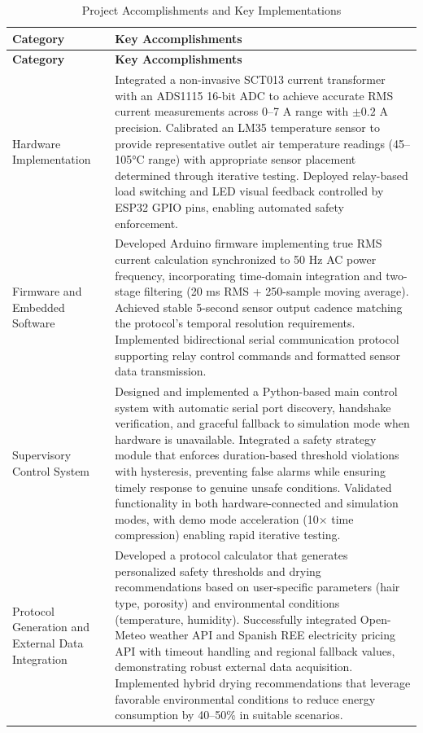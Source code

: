 \documentclass[11pt,a4paper]{article}
\begin{document}
\begin{longtable}{|p{}|p{}|}
\caption{Project Accomplishments and Key Implementations}
\label{tab:accomplishments} \\
\hline
\textbf{Category} & \textbf{Key Accomplishments} \\
\hline
\endfirsthead
\hline
\textbf{Category} & \textbf{Key Accomplishments} \\
\hline
\endhead
\hline
\endfoot
\hline
\endlastfoot
Hardware Implementation & Integrated a non-invasive SCT013 current transformer with an ADS1115 16-bit ADC to achieve accurate RMS current measurements across 0--7 A range with $\pm 0.2$ A precision. Calibrated an LM35 temperature sensor to provide representative outlet air temperature readings (45--105°C range) with appropriate sensor placement determined through iterative testing. Deployed relay-based load switching and LED visual feedback controlled by ESP32 GPIO pins, enabling automated safety enforcement. \\
\hline
Firmware and Embedded Software & Developed Arduino firmware implementing true RMS current calculation synchronized to 50 Hz AC power frequency, incorporating time-domain integration and two-stage filtering (20 ms RMS + 250-sample moving average). Achieved stable 5-second sensor output cadence matching the protocol's temporal resolution requirements. Implemented bidirectional serial communication protocol supporting relay control commands and formatted sensor data transmission. \\
\hline
Supervisory Control System & Designed and implemented a Python-based main control system with automatic serial port discovery, handshake verification, and graceful fallback to simulation mode when hardware is unavailable. Integrated a safety strategy module that enforces duration-based threshold violations with hysteresis, preventing false alarms while ensuring timely response to genuine unsafe conditions. Validated functionality in both hardware-connected and simulation modes, with demo mode acceleration (10× time compression) enabling rapid iterative testing. \\
\hline
Protocol Generation and External Data Integration & Developed a protocol calculator that generates personalized safety thresholds and drying recommendations based on user-specific parameters (hair type, porosity) and environmental conditions (temperature, humidity). Successfully integrated Open-Meteo weather API and Spanish REE electricity pricing API with timeout handling and regional fallback values, demonstrating robust external data acquisition. Implemented hybrid drying recommendations that leverage favorable environmental conditions to reduce energy consumption by 40--50\% in suitable scenarios. \\

\end{longtable}
\end{document}
